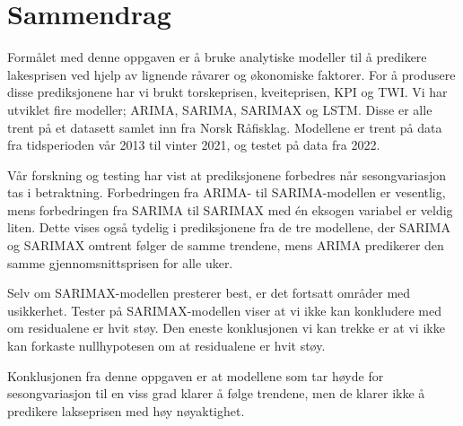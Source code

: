 \section*{Sammendrag}
Formålet med denne oppgaven er å bruke analytiske modeller til å predikere lakesprisen ved hjelp av lignende råvarer og økonomiske faktorer. For å produsere disse prediksjonene har vi brukt torskeprisen, kveiteprisen, KPI og TWI. Vi har utviklet fire modeller; ARIMA, SARIMA, SARIMAX og LSTM. Disse er alle trent på et datasett samlet inn fra Norsk Råfisklag. Modellene er trent på data fra tidsperioden vår 2013 til vinter 2021, og testet på data fra 2022.

Vår forskning og testing har vist at prediksjonene forbedres når sesongvariasjon tas i betraktning. Forbedringen fra ARIMA- til SARIMA-modellen er vesentlig, mens forbedringen fra SARIMA til SARIMAX med én eksogen variabel er veldig liten. Dette vises også tydelig i prediksjonene fra de tre modellene, der SARIMA og SARIMAX omtrent følger de samme trendene, mens ARIMA predikerer den samme gjennomsnittsprisen for alle uker.

Selv om SARIMAX-modellen presterer best, er det fortsatt områder med usikkerhet. Tester på SARIMAX-modellen viser at vi ikke kan konkludere med om residualene er hvit støy. Den eneste konklusjonen vi kan trekke er at vi ikke kan forkaste nullhypotesen om at residualene er hvit støy.

Konklusjonen fra denne oppgaven er at modellene som tar høyde for sesongvariasjon til en viss grad klarer å følge trendene, men de klarer ikke å predikere lakseprisen med høy nøyaktighet. 


